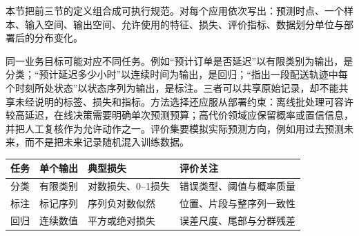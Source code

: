 本节把前三节的定义组合成可执行规范。对每个应用依次写出：预测时点、一个样本、输入空间、输出空间、允许使用的特征、损失、评价指标、数据划分单位与部署后的分布变化。

同一业务目标可能对应不同任务。例如“预计订单是否延迟”以有限类别为输出，是分类；“预计延迟多少小时”以连续时间为输出，是回归；“指出一段配送轨迹中每个时刻所处状态”以状态序列为输出，是标注。三者可以共享原始记录，却不能共享未经说明的标签、损失和指标。方法选择还应服从部署约束：离线批处理可容许较高延迟，在线决策需要明确单次预测预算；高代价领域应保留概率或置信信息，并把人工复核作为允许动作之一。评价集要模拟实际预测方向，例如用过去预测未来，而不是把未来记录随机混入训练数据。

\begin{center}
\begin{tabularx}{\linewidth}{@{}l l l X@{}}
\toprule
任务 & 单个输出 & 典型损失 & 评价关注\\ \midrule
分类 & 有限类别 & 对数损失、0--1损失 & 错误类型、阈值与概率质量\\
标注 & 标记序列 & 序列负对数似然 & 位置、片段与整序列一致性\\
回归 & 连续数值 & 平方或绝对损失 & 误差尺度、尾部与分群残差\\
\bottomrule
\end{tabularx}
\end{center}

